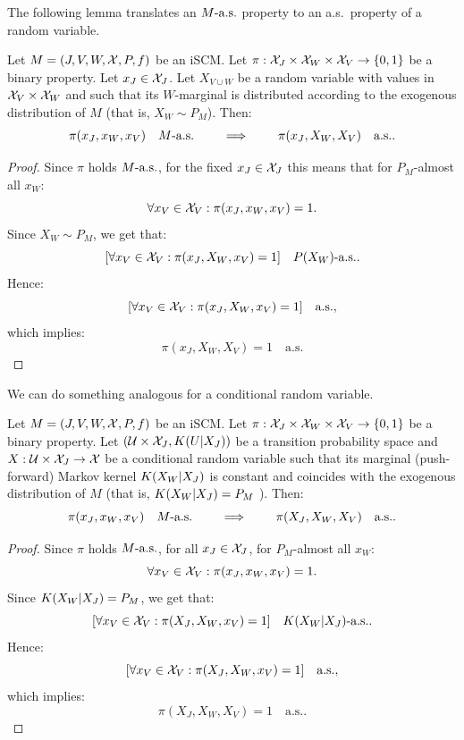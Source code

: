 The following lemma translates an $M\text{-a.s.}$ property to an a.s.\ property of a random variable.
\begin{Lem}\label{lem:M-as_to_rv-as}
  Let $M = \left ( J, V, W, \mathcal{X}, P, f \right )$ be an iSCM.
  Let $\pi : \mathcal{X}_J \times \mathcal{X}_W \times \mathcal{X}_V \to \{0,1\}$ be a binary property.
  Let $x_J \in \mathcal{X}_J$. 
  Let $X_{V \cup W}$ be a random variable with values in $\mathcal{X}_V \times \mathcal{X}_W$ and such that its $W$-marginal is distributed according to the exogenous distribution of $M$ (that is, $X_W \sim P_M$).
  Then:
  $$\pi(x_J,x_W,x_V) \quad M\text{-a.s.} \qquad \implies \qquad \pi(x_J,X_W,X_V) \quad \text{a.s.}.$$
\end{Lem}
\begin{proof}
  Since $\pi$ holds $M\text{-a.s.}$, for the fixed $x_J \in \mathcal{X}_J$ this means that for $P_M$-almost all $x_W$:
    $$\forall x_V \in \mathcal{X}_V: \pi(x_J,x_W,x_V) = 1.$$
  Since $X_W \sim P_M$, we get that:
    $$[\forall x_V  \in \mathcal{X}_V: \pi(x_J,X_W,x_V) = 1] \quad P(X_W)\text{-a.s.}.$$
  Hence:
    $$[\forall x_V  \in \mathcal{X}_V: \pi(x_J,X_W,x_V) = 1] \quad \text{a.s.},$$
  which implies:
    $$\pi(x_J,X_W,X_V) = 1 \quad \text{a.s.}$$
\end{proof}
We can do something analogous for a conditional random variable.
\begin{Lem}\label{lem:M-as_to_crv-as}
  Let $M = \left ( J, V, W, \mathcal{X}, P, f \right )$ be an iSCM.
  Let $\pi : \mathcal{X}_J \times \mathcal{X}_W \times \mathcal{X}_V \to \{0,1\}$ be a binary property.
  Let $(\mathcal{U} \times \mathcal{X}_{J}, K(U|X_J))$ be a transition probability space and $X : \mathcal{U} \times \mathcal{X}_{J} \to \mathcal{X}$ be a conditional random variable such that its marginal (push-forward) Markov kernel $K(X_W | X_{J})$ is constant and coincides with the exogenous distribution of $M$ (that is, $K(X_W | X_{J}) = P_M$ ).
  Then:
  $$\pi(x_J,x_W,x_V) \quad M\text{-a.s.} \qquad \implies \qquad \pi(X_J,X_W,X_V) \quad \text{a.s.}.$$
\end{Lem}
\begin{proof}
  Since $\pi$ holds $M\text{-a.s.}$, for all $x_J \in \mathcal{X}_J$, for $P_M$-almost all $x_W$:
    $$\forall x_V \in \mathcal{X}_V: \pi(x_J,x_W,x_V) = 1.$$
  Since $K(X_W | X_{J}) = P_M$, we get that:
    $$[\forall x_V  \in \mathcal{X}_V: \pi(X_J,X_W,x_V) = 1] \quad K(X_W|X_J)\text{-a.s.}.$$
  Hence:
    $$[\forall x_V  \in \mathcal{X}_V: \pi(X_J,X_W,x_V) = 1] \quad \text{a.s.},$$
  which implies:
    $$\pi(X_J,X_W,X_V) = 1 \quad \text{a.s.}.$$
\end{proof}


